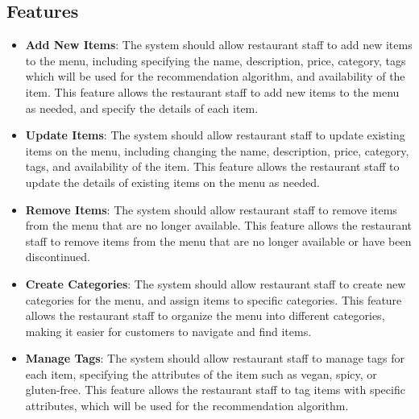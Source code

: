 \subsection{Features}
\begin{itemize}
    \item \textbf{Add New Items}: The system should allow restaurant staff to add new items to the menu, including specifying the name, description, price, category, tags which will be used for the recommendation algorithm, and availability of the item. This feature allows the restaurant staff to add new items to the menu as needed, and specify the details of each item.
    \item \textbf{Update Items}: The system should allow restaurant staff to update existing items on the menu, including changing the name, description, price, category, tags, and availability of the item. This feature allows the restaurant staff to update the details of existing items on the menu as needed.
    \item \textbf{Remove Items}: The system should allow restaurant staff to remove items from the menu that are no longer available. This feature allows the restaurant staff to remove items from the menu that are no longer available or have been discontinued.
    \item \textbf{Create Categories}: The system should allow restaurant staff to create new categories for the menu, and assign items to specific categories. This feature allows the restaurant staff to organize the menu into different categories, making it easier for customers to navigate and find items.
    \item \textbf{Manage Tags}: The system should allow restaurant staff to manage tags for each item, specifying the attributes of the item such as vegan, spicy, or gluten-free. This feature allows the restaurant staff to tag items with specific attributes, which will be used for the recommendation algorithm.
\end{itemize}